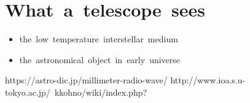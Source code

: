\section{What\ a\ telescope\ sees}
\begin{itemize}
    \item the\ low\ temperature\ interstellar\ medium
    \item the\ astronomical\ object\ in\ early\ universe
\end{itemize}

\begin{thebibliography}{99}
\bibitem{}https://astro-dic.jp/millimeter-radio-wave/
\bibitem{}http://www.ioa.s.u-tokyo.ac.jp/~kkohno/wiki/index.php?
\end{thebibliography}